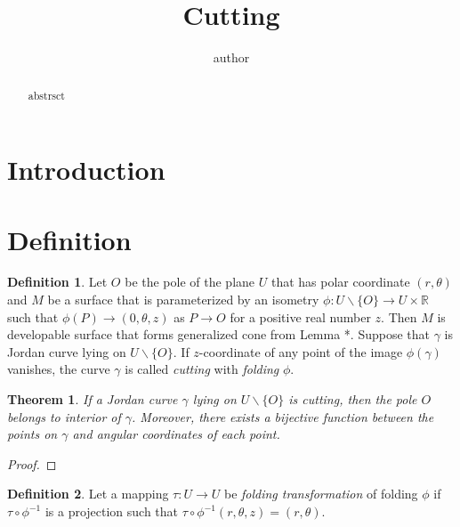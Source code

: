 \documentclass{kms-j}
\theoremstyle{plain}
\newtheorem{theorem}{Theorem}[section]
\theoremstyle{definition}
\newtheorem*{definition}{Definition}
\theoremstyle{remark}
\begin{document}
\title[Cutting]
{Cutting}

\author[author]{author}
\address{address}


\begin{abstract}
abstrsct
\end{abstract}

\maketitle

\section{Introduction}

\section{Definition}
\begin{definition}
Let $O$ be the pole of the plane $U$ that has polar coordinate $(r,\theta)$ and $M$ be a surface that is parameterized by an isometry $\phi : U\backslash \{ O\} \to U \times {\mathbb R}$ such that $\phi(P)\to(0,\theta,z)$ as $P\to O$ for a positive real number $z$.
Then $M$ is developable surface that forms generalized cone from Lemma *.
Suppose that $\gamma$ is Jordan curve lying on $U\backslash \{ O\}$.
If $z$-coordinate of any point of the image $\phi(\gamma)$ vanishes, the curve $\gamma$ is called {\it cutting} with {\it folding} $\phi$.
\end{definition}

\begin{theorem}
If a Jordan curve $\gamma$ lying on $U\backslash \{ O\}$ is cutting, then the pole $O$ belongs to interior of $\gamma$.
Moreover, there exists a bijective function between the points on $\gamma$ and angular coordinates of each point.
\end{theorem}

\begin{proof}
\end{proof}

\begin{definition}
Let a mapping $\tau :U\to U$ be {\it folding transformation} of folding $\phi$ if $\tau\circ\phi ^{-1}$ is a projection such that $\tau\circ\phi ^{-1}(r,\theta,z)=(r,\theta)$.
\end{definition}
\end{document}
